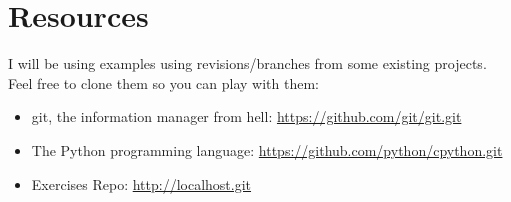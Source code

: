 
\section{Resources}

I will be using examples using revisions/branches from some existing projects. Feel free to clone them so you can play with them:

\begin{itemize}

	\item git, the information manager from hell: \url{https://github.com/git/git.git}
	\label{git_repo}

	\item The Python programming language: \url{https://github.com/python/cpython.git}
	\label{python_repo}
	
	\item Exercises Repo: \url{http://localhost.git} %
	\label{exercises_repo}

\end{itemize}
